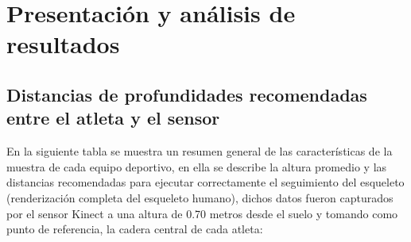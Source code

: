\afterpage{\blankpage}
\newpage
\afterpage{\blankpage}
\newpage
\chapter{Presentaci\'on y an\'alisis de resultados}
\section{Distancias de profundidades recomendadas entre el atleta y el sensor} \label{res:idMov}
En la siguiente tabla se muestra un resumen general de las caracter\'isticas de la muestra de cada equipo deportivo, en ella se describe la altura promedio y las distancias recomendadas para ejecutar correctamente el seguimiento del esqueleto (renderizaci\'on completa del esqueleto humano), dichos datos fueron capturados por el sensor Kinect a una altura de 0.70 metros desde el suelo y tomando como punto de referencia, la cadera central de cada atleta:
